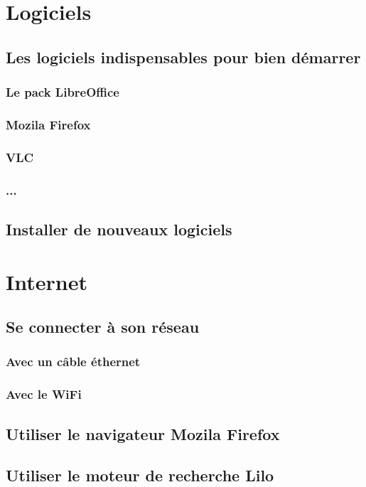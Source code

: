 \documentclass[12pt]{book}
\begin{document}
\newpage
\chapter{Logiciels}
\section{Les logiciels indispensables pour bien démarrer}
	\subsection{Le pack LibreOffice}
	\subsection{Mozila Firefox}
	\subsection{VLC}
	\subsection{...}

\section{Installer de nouveaux logiciels}

\newpage
\chapter{Internet}
\section{Se connecter à son réseau}
	\subsection{Avec un câble éthernet}
	\subsection{Avec le WiFi}

\section{Utiliser le navigateur Mozila Firefox}

\section{Utiliser le moteur de recherche Lilo}
\end{document}

